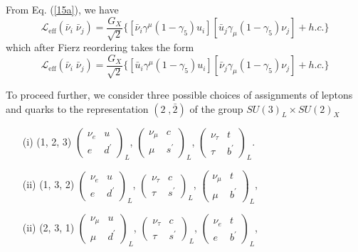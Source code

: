 \documentclass{ws-ijmpa}
\begin{document}
From Eq. (\ref{15a}), we have
\begin{equation}
\mathcal{L}_{\text{eff}}(\bar{\nu}_{i}\;\bar{\nu}_j) = \frac{G_X}{\sqrt2}\{[\bar{\nu}_{i}\gamma^{\mu}(1-\gamma_5)u_i][\bar{u}_{j}\gamma_{\mu}(1-\gamma_5)\nu_{j}]+ h.c.\}\label{18a}
\end{equation}
which after Fierz reordering takes the form
\begin{equation}
\mathcal{L}_{\text{eff}}(\bar{\nu}_{i}\;\bar{\nu}_j) = \frac{G_X}{\sqrt2}\{[\bar{u}_{i}\gamma^{\mu}(1-\gamma_5)u_i][\bar{\nu}_{j}\gamma_{\mu}(1-\gamma_5)\nu_{j}]+ h.c.\}\label{18b}
\end{equation}

To proceed further, we consider three possible choices of assignments of leptons and quarks to the representation $(2\; , \bar{2})$ of the group $SU(3)_{L}\times SU(2)_{X}$
\begin{itemize}
\item[(i)] (1\;, 2\;, 3) \hspace{1cm} $\left(\begin{array}{cc} \nu_{e} & u \\
e & d^{\prime}\end{array}\right)_{L}$\quad, \quad\quad\quad $\left(\begin{array}{cc} \nu_{\mu} & c \\
\mu & s^{\prime}\end{array}\right)_{L}$\quad, \quad\quad\quad $\left(\begin{array}{cc} \nu_{\tau} & t \\
\tau & b^{\prime}\end{array}\right)_{L}$.\\
\item[(ii)] (1\;, 3\;, 2) \hspace{1cm} $\left(\begin{array}{cc} \nu_{e} & u \\
e & d^{\prime}\end{array}\right)_{L}$\quad, \quad\quad\quad $\left(\begin{array}{cc} \nu_{\tau} & c \\
\tau & s^{\prime}\end{array}\right)_{L}$\quad, \quad\quad\quad $\left(\begin{array}{cc} \nu_{\mu} & t \\
\mu & b^{\prime}\end{array}\right)_{L}$,\\
\item[(ii)] (2\;, 3\;, 1) \hspace{1cm} $\left(\begin{array}{cc} \nu_{\mu} & u \\
\mu & d^{\prime}\end{array}\right)_{L}$\quad, \quad\quad\quad $\left(\begin{array}{cc} \nu_{\tau} & c \\
\tau & s^{\prime}\end{array}\right)_{L}$\quad, \quad\quad\quad $\left(\begin{array}{cc} \nu_{e} & t \\
e & b^{\prime}\end{array}\right)_{L}$,
\end{itemize}
\end{document}
